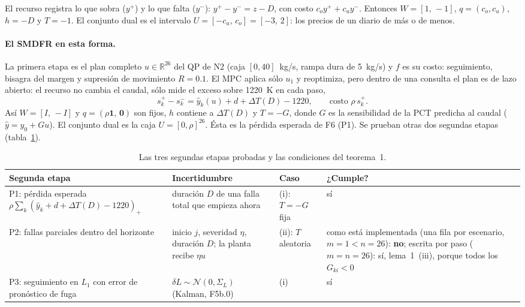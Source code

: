 \begin{ejemplo}
El recurso registra lo que sobra ($y^+$) y lo que falta ($y^-$): $y^+-y^-=z-D$, con costo
$c_oy^++c_uy^-$. Entonces $W=[1,\,-1]$, $q=(c_o,c_u)$, $h=-D$ y $T=-1$. El conjunto dual es el
intervalo $U=[-c_u,\,c_o]=[-3,\,2]$: los precios de un diario de más o de menos.
\end{ejemplo}

\paragraph{El SMDFR en esta forma.} La primera etapa es el plan completo $u\in\mathbb R^{26}$
del QP de N2 (caja $[0,40]$~kg/s, rampa dura de 5~kg/s) y $f$ es su costo: seguimiento, bisagra
del margen y supresión de movimiento $R=0.1$. El MPC aplica sólo $u_1$ y reoptimiza, pero dentro
de una consulta el plan es de lazo abierto: el recurso no cambia el caudal, sólo mide el exceso
sobre 1220~K en cada paso,
\[
s^+_k-s^-_k=\hat y_k(u)+d+\Delta T(D)-1220,\qquad \text{costo } \rho\,s^+_k .
\]
Así $W=[I,\,-I]$ y $q=(\rho\mathbf 1,\,\mathbf 0)$ son fijos, $h$ contiene a $\Delta T(D)$ y
$T=-G$, donde $G$ es la sensibilidad de la PCT predicha al caudal ($\hat y=y_0+Gu$). El conjunto
dual es la caja $U=[0,\rho]^{26}$. Ésta es la pérdida esperada de F6 (P1). Se prueban otras dos
segundas etapas (tabla~\ref{tab:f9-condiciones}).

\begin{table}[H]\centering\small
\caption{Las tres segundas etapas probadas y las condiciones del teorema~1.}
\label{tab:f9-condiciones}
\begin{tabular}{@{}>{\raggedright\arraybackslash}p{3.5cm}>{\raggedright\arraybackslash}p{3.9cm}>{\raggedright\arraybackslash}p{1.9cm}>{\raggedright\arraybackslash}p{4.3cm}@{}}
\toprule
Segunda etapa & Incertidumbre & Caso & ¿Cumple?\\
\midrule
P1: pérdida esperada $\rho\sum_k(\hat y_k+d+\Delta T(D)-1220)_+$ & duración $D$ de una falla total que empieza ahora & (i): $T=-G$ fija & sí\\
P2: fallas parciales dentro del horizonte & inicio $j$, severidad $\eta$, duración $D$; la planta recibe $\eta u$ & (ii): $T$ aleatoria & como está implementada (una fila por escenario, $m=1<n=26$): \textbf{no}; escrita por paso ($m=n=26$): sí, lema~1~(iii), porque todos los $G_{ki}<0$\\
P3: seguimiento en $L_1$ con error de pronóstico de fuga & $\delta L\sim\mathcal N(0,\Sigma_L)$ (Kalman, F5b.0) & (i) & sí\\
\bottomrule
\end{tabular}
\end{table}

